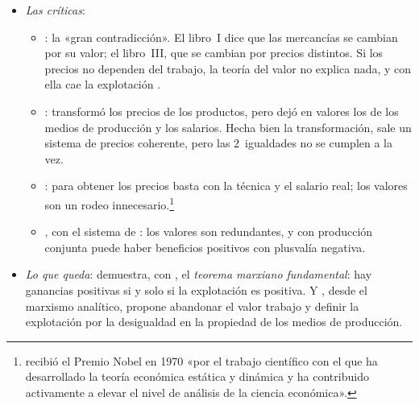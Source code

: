 \documentclass[11pt]{article}
\begin{document}
\begin{itemize}
\item \emph{Las críticas}:
  \begin{itemize}
  \item \textcite{BohmBawerk1896Abschluss}: la «gran contradicción». El libro~I dice que las mercancías se cambian por su valor; el libro~III, que se cambian por precios distintos. Si los precios no dependen del trabajo, la teoría del valor no explica nada, y con ella cae la explotación .
  \item \textcite{Bortkiewicz1907Berichtigung}:  transformó los precios de los productos, pero dejó en valores los de los medios de producción y los salarios. Hecha bien la transformación, sale un sistema de precios coherente, pero las 2~igualdades no se cumplen a la vez.
  \item \textcite{Samuelson1971Understanding}: para obtener los precios basta con la técnica y el salario real; los valores son un rodeo innecesario.\footnote{ recibió el Premio Nobel en 1970 «por el trabajo científico con el que ha desarrollado la teoría económica estática y dinámica y ha contribuido activamente a elevar el nivel de análisis de la ciencia económica»\nocite{Nobel1970Samuelson}.}
  \item \textcite{Steedman1977Marx}, con el sistema de \textcite{Sraffa1960Production}: los valores son redundantes, y con producción conjunta puede haber beneficios positivos con plusvalía negativa\nocite{Steedman1975Positive}.
  \end{itemize}
\item \emph{Lo que queda}: \textcite{Morishima1973Marx} demuestra, con , el \emph{teorema marxiano fundamental}: hay ganancias positivas si y solo si la explotación es positiva. Y \textcite{Roemer1982General,Roemer1985Should}, desde el marxismo analítico, propone abandonar el valor trabajo y definir la explotación por la desigualdad en la propiedad de los medios de producción.
\end{itemize}
\end{document}
